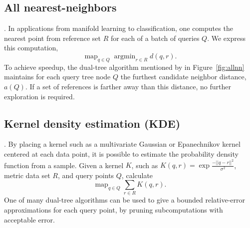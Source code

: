\documentclass[twoside,leqno,twocolumn]{article}
\DeclareMathOperator*{\map}{map}
\DeclareMathOperator*{\argmin}{argmin}
\newcommand{\fig}[1]{Figure~\ref{fig:#1}}
\newcommand{\mysub}[1]{\subsection{#1}. }
\newcommand{\ocpos}[1]{c^{+}_{#1}}
\newcommand{\cpos}[2]{\ocpos{#1 \neq #2}}
\newcommand{\simil}[2]{S_{#1#2}}
\newcommand{\vecrho}{\vec{\rho}}
\newcommand{\vecalpha}{\vec{\alpha}}
\newcommand{\frho}[1]{\rho_{#1}}
\newcommand{\falpha}[1]{\alpha_{#1}}
\newcommand{\falphaj}[2]{\alpha_{#1[#2]}}
\begin{document}
\mysub{All nearest-neighbors}
In applications from manifold learning to classification, one computes the nearest point from reference set $R$ for each of a batch of queries $Q$.
We express this computation,
\[\map_{q \in Q} \argmin_{r \in R} d(q,r).\]
\noindent To achieve speedup, the dual-tree algorithm mentioned by \cite{gray_nbody} in \fig{allnn} maintains for each query tree node $Q$ the furthest candidate neighbor distance, $a(Q)$.
If a set of references is farther away than this distance, no further exploration is required.

\mysub{Kernel density estimation (KDE)}
By placing a kernel such as a multivariate Gaussian or Epanechnikov kernel centered at each data point, it is possible to estimate the probability density function from a sample.
Given a kernel $K$, such as $K(q,r) = \exp{\frac{-||q-r||^2}{\sigma^2}}$, metric data set $R$, and query points $Q$, calculate
\[\map_{q \in Q} \sum_{r \in R} K(q, r).\]
One of many dual-tree algorithms \cite{gray_kde, lee_gauss1, lee_gauss2} can be used to give a bounded relative-error approximations for each query point, by pruning subcomputations with acceptable error.


\end{document}
